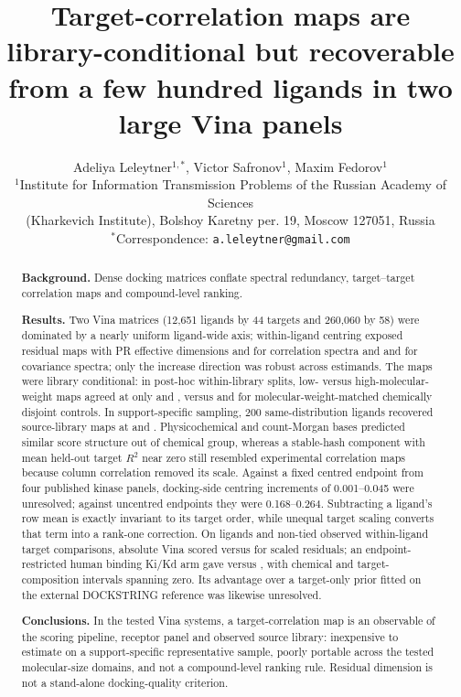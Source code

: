 \documentclass[11pt]{article}
\title{Target-correlation maps are library-conditional but recoverable from a
few hundred ligands in two large Vina panels}
\author{
Adeliya Leleytner$^{1,*}$, Victor Safronov$^{1}$, Maxim Fedorov$^{1}$\\[4pt]
\small $^{1}$Institute for Information Transmission Problems of the Russian Academy of Sciences\\
\small (Kharkevich Institute), Bolshoy Karetny per. 19, Moscow 127051, Russia\\
\small $^{*}$Correspondence: \texttt{a.leleytner@gmail.com}
}
\date{}
\begin{document}
\maketitle

\begin{abstract}
\textbf{Background.}
Dense docking matrices conflate spectral redundancy, target--target correlation maps and
compound-level ranking.

\textbf{Results.}
Two Vina matrices (12,651 ligands by 44 targets and 260,060 by 58) were dominated by a nearly
uniform ligand-wide axis; within-ligand centring exposed residual maps with PR effective
dimensions \DffResidualPR{} and \DsResidualPR{} for correlation spectra and
\DffResidualCovariancePR{} and \DsResidualCovariancePR{} for covariance spectra; only the
increase direction was robust across estimands.
The maps were library conditional: in post-hoc
within-library splits, low-
versus high-molecular-weight maps agreed at only \DffMWDomainRho{} and
\DsMWDomainRho{}, versus \DffMWDomainControl{} and \DsMWDomainControl{} for
molecular-weight-matched chemically disjoint controls. In support-specific sampling, 200
same-distribution ligands recovered source-library maps at \DffProbeTwoHundred{} and
\DsProbeTwoHundred{}. Physicochemical and count-Morgan bases predicted similar score
structure out of chemical group, whereas a stable-hash component with mean held-out target
$R^2$ near zero still resembled experimental correlation maps because column correlation
removed its scale. Against a fixed centred endpoint from four published kinase panels,
docking-side centring increments of 0.001--0.045 were unresolved; against uncentred endpoints
they were 0.168--0.264. Subtracting a ligand's row mean is exactly invariant to its target
order, while unequal target scaling converts that term into a rank-one correction. On
\BroadRankingEvaluatedLigands{} ligands and \BroadRankingPairs{} non-tied observed
within-ligand target comparisons, absolute Vina scored \BroadRankingAbsolute{}
versus \BroadRankingResidual{} for scaled residuals; an endpoint-restricted human binding
Ki/Kd arm gave
\BroadHumanKiKdAbsolute{} versus \BroadHumanKiKdResidual{}, with chemical and target-
composition intervals spanning zero. Its \BroadRankingAbsoluteMinusDockingPrior{} advantage
over a target-only prior fitted on the external DOCKSTRING reference was likewise unresolved.

\textbf{Conclusions.}
In the tested Vina systems, a target-correlation map is an observable of the scoring
pipeline, receptor panel and observed source library: inexpensive to estimate on a
support-specific representative sample, poorly portable across the tested molecular-size
domains, and not a compound-level ranking rule.
Residual dimension is not a stand-alone docking-quality criterion.


\end{abstract}
\end{document}
